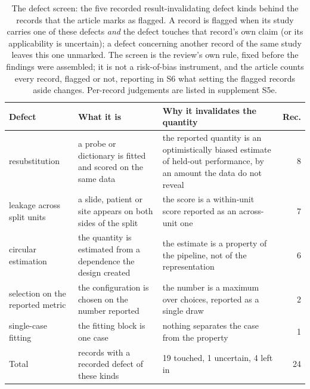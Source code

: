 \begin{table}[!t]
\centering\footnotesize\setlength\tabcolsep{3pt}\renewcommand{\arraystretch}{1.08}
\caption{The defect screen: the five recorded result-invalidating defect kinds behind the records that the article marks as flagged. A record is flagged when its study carries one of these defects \emph{and} the defect touches that record's own claim (or its applicability is uncertain); a defect concerning another record of the same study leaves this one unmarked. The screen is the review's own rule, fixed before the findings were assembled; it is not a risk-of-bias instrument, and the article counts every record, flagged or not, reporting in S6 what setting the flagged records aside changes. Per-record judgements are listed in supplement S5e.}
\label{tab:defects}
\begin{tabular}{@{}L{1.9cm}L{2.4cm}L{2.0cm}r@{}}
\toprule
Defect & What it is & Why it invalidates the quantity & Rec. \\
\midrule
resubstitution & a probe or dictionary is fitted and scored on the same data & the reported quantity is an optimistically biased estimate of held-out performance, by an amount the data do not reveal & 8 \\
leakage across split units & a slide, patient or site appears on both sides of the split & the score is a within-unit score reported as an across-unit one & 7 \\
circular estimation & the quantity is estimated from a dependence the design created & the estimate is a property of the pipeline, not of the representation & 6 \\
selection on the reported metric & the configuration is chosen on the number reported & the number is a maximum over choices, reported as a single draw & 2 \\
single-case fitting & the fitting block is one case & nothing separates the case from the property & 1 \\
\midrule
Total & records with a recorded defect of these kinds & 19 touched, 1 uncertain, 4 left in & 24 \\
\bottomrule
\end{tabular}
\end{table}
